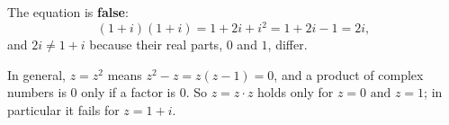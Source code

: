 The equation is \textbf{false}:
\[(1+i)(1+i)=1+2i+i^2=1+2i-1=2i,\]
and $2i\ne1+i$ because their real parts, $0$ and $1$, differ.

In general, $z=z^2$ means $z^2-z=z(z-1)=0$, and a product of complex numbers is $0$ only if a factor is $0$. So $z=z\cdot z$ holds only for $\boxed{z=0\text{ and }z=1}$; in particular it fails for $z=1+i$.
